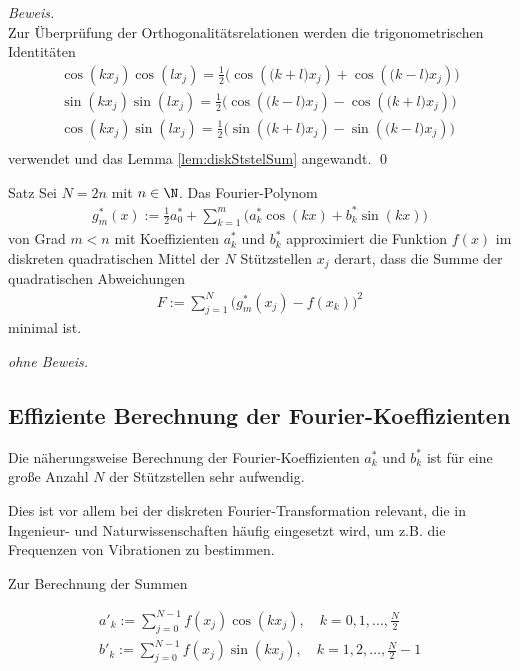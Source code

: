 \textit{Beweis.} \\
Zur Überprüfung der Orthogonalitätsrelationen werden die trigonometrischen Identitäten
\begin{align*}
  \cos(kx_j)\cos(lx_j) = \tfrac{1}{2}\Big(\cos(\big(k+l\big)x_j) + \cos(\big(k-l\big)x_j)\Big) \\
  \sin(kx_j)\sin(lx_j) = \tfrac{1}{2}\Big(\cos(\big(k-l\big)x_j) - \cos(\big(k+l\big)x_j)\Big) \\
  \cos(kx_j)\sin(lx_j) = \tfrac{1}{2}\Big(\sin(\big(k+l\big)x_j) - \sin(\big(k-l\big)x_j)\Big) \\
\end{align*}
verwendet und das Lemma \ref{lem:diskStstelSum} angewandt.
\qed 

\begin{colbox}{Satz}
  Sei $N=2n$ mit $n\in\N$. Das Fourier-Polynom
  \begin{align*}
  g_m^*(x) := \tfrac{1}{2}a^*_0 + \sum_{k=1}^{m}\Big(a^*_k\cos(kx)+b^*_k\sin(kx)\Big)
  \end{align*}
  von Grad $m<n$ mit Koeffizienten $a_k^*$ und $b^*_k$ approximiert die Funktion $f(x)$ im diskreten quadratischen 
  Mittel der $N$ Stützstellen $x_j$ derart, dass die Summe der quadratischen Abweichungen 
  \begin{align*}
    F:=\sum_{j=1}^{N}\Big(g^*_m(x_j)-f(x_k)\Big)^2
  \end{align*}
  minimal ist.
\end{colbox}
\textit{ohne Beweis.}



\subsection{Effiziente Berechnung der Fourier-Koeffizienten}
Die näherungsweise Berechnung der Fourier-Koeffizienten $a_k^*$ und $b_k^*$ ist für eine große Anzahl $N$ der 
Stützstellen sehr aufwendig. 

Dies ist vor allem bei der diskreten Fourier-Transformation relevant, die in Ingenieur- und Naturwissenschaften 
häufig eingesetzt wird, um z.B. die Frequenzen von Vibrationen zu bestimmen. 

Zur Berechnung der Summen 

%
\begin{align*}
  a'_k := \sum_{j=0}^{N-1} f(x_j)\cos(kx_j), \quad k=0,1,\dots,\tfrac{N}{2} \\
  b'_k := \sum_{j=0}^{N-1} f(x_j)\sin(kx_j), \quad k=1,2,\dots,\tfrac{N}{2}-1 
  \tag{1}\label{eq:fftEQ1}
\end{align*}
%

